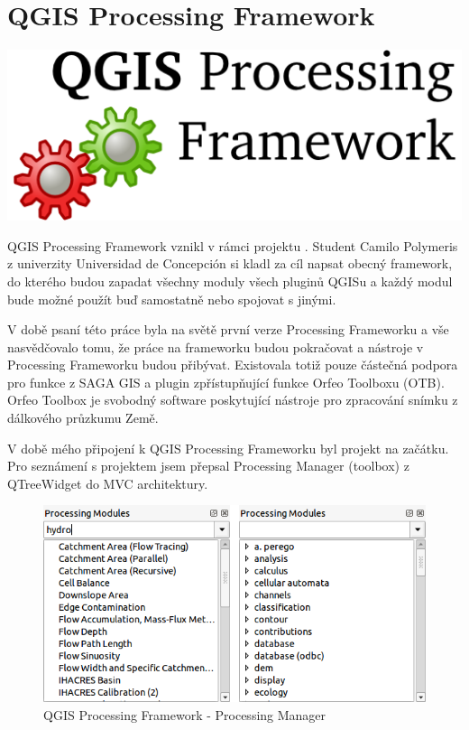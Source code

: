 \newpage
{}
\section{QGIS Processing Framework}
\nocite{pf:www}


\begin{center}
		\includegraphics[scale=0.30]{pictures/qgis_pf}
\end{center}

QGIS Processing Framework vznikl v rámci projektu  . Student
Camilo Polymeris z univerzity Universidad de Concepción si kladl za
cíl napsat obecný framework, do kterého budou zapadat všechny moduly
všech pluginů QGISu a každý modul bude možné použít buď samostatně
nebo spojovat s jinými.

V době psaní této práce byla na světě první verze Processing
Frameworku a vše nasvědčovalo tomu, že práce na frameworku budou
pokračovat a nástroje v Processing Frameworku budou
přibývat. Existovala totiž pouze částečná podpora pro funkce z SAGA
GIS a plugin zpřístupňující funkce  Orfeo
Toolboxu (OTB). Orfeo Toolbox je svobodný software poskytující
nástroje pro zpracování snímku z 
dálkového průzkumu Země.

V době mého připojení k QGIS Processing Frameworku byl projekt na
začátku. Pro seznámení s projektem jsem přepsal Processing Manager
(toolbox) z QTreeWidget do MVC architektury.

\begin{figure}[h]
	\centering
	\includegraphics[scale=0.5]{pictures/pf/processing_manager_small}
	\caption{QGIS Processing Framework - Processing Manager}
  	\label{pf:pm}
\end{figure}

